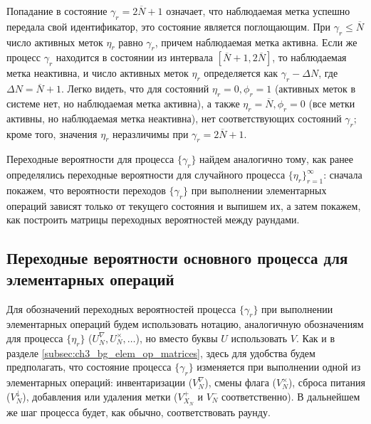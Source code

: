 Попадание в состояние $\gamma_r = 2\overline{N} + 1$ означает, что наблюдаемая метка успешно передала свой идентификатор, это состояние является поглощающим. При $\gamma_r \leqslant \overline{N}$ число активных меток $\eta_r$ равно $\gamma_r$, причем наблюдаемая метка активна. Если же процесс $\gamma_r$ находится в состоянии из интервала $[\overline{N}+1, 2\overline{N}]$, то наблюдаемая метка неактивна, и число активных меток $\eta_r$ определяется как $\gamma_r - \Delta N$, где $\Delta N = \overline{N} + 1$. Легко видеть, что для состояний $\eta_r = 0, \phi_r = 1$ (активных меток в системе нет, но наблюдаемая метка активна), а также $\eta_r = \overline{N}, \phi_r = 0$ (все метки активны, но наблюдаемая метка неактивна), нет соответствующих состояний $\gamma_r$; кроме того, значения $\eta_r$ неразличимы при $\gamma_r = 2\overline{N} + 1$.

Переходные вероятности для процесса $\{ \gamma_r \}$ найдем аналогично тому, как ранее определялись переходные вероятности для случайного процесса $\{ \eta_r \}_{r=1}^\infty$: сначала покажем, что вероятности переходов $\{ \gamma_r \}$ при выполнении элементарных операций зависят только от текущего состояния и выпишем их, а затем покажем, как построить матрицы переходных вероятностей между раундами.



\subsection{Переходные вероятности основного процесса для элементарных операций}
Для обозначений переходных вероятностей процесса $\{ \gamma_r \}$ при выполнении элементарных операций будем использовать нотацию, аналогичную обозначениям для процесса $\{ \eta_r \}$ ($U_N^{\nabla}, U_N^{\times}, \dots$), но вместо буквы $U$ использовать $V$. Как и в разделе \ref{subsec:ch3_bg_elem_op_matrices}, здесь для удобства будем предполагать, что состояние процесса $\{ \gamma_r \}$ изменяется при выполнении одной из элементарных операций: инвентаризации ($V_N^\nabla$), смены флага ($V_N^\times$), сброса питания ($V_N^\downarrow$), добавления или удаления метки ($V^+_{X_N}$ и $V^-_N$ соответственно). В дальнейшем же шаг процесса будет, как обычно, соответствовать раунду.

